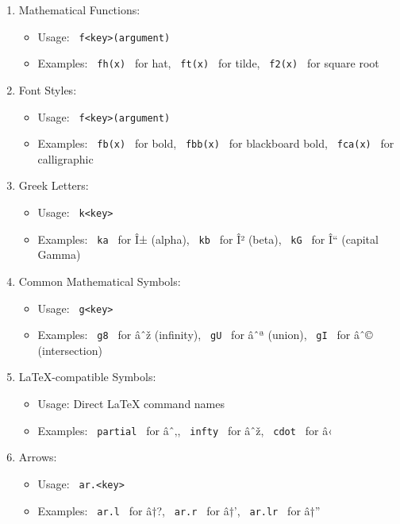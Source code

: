 \begin{enumerate}
\tightlist
\item
  Mathematical Functions:

  \begin{itemize}
  \tightlist
  \item
    Usage: \texttt{\ f\textless{}key\textgreater{}(argument)\ }
  \item
    Examples: \texttt{\ fh(x)\ } for hat, \texttt{\ ft(x)\ } for tilde,
    \texttt{\ f2(x)\ } for square root
  \end{itemize}
\item
  Font Styles:

  \begin{itemize}
  \tightlist
  \item
    Usage: \texttt{\ f\textless{}key\textgreater{}(argument)\ }
  \item
    Examples: \texttt{\ fb(x)\ } for bold, \texttt{\ fbb(x)\ } for
    blackboard bold, \texttt{\ fca(x)\ } for calligraphic
  \end{itemize}
\item
  Greek Letters:

  \begin{itemize}
  \tightlist
  \item
    Usage: \texttt{\ k\textless{}key\textgreater{}\ }
  \item
    Examples: \texttt{\ ka\ } for Î± (alpha), \texttt{\ kb\ } for Î²
    (beta), \texttt{\ kG\ } for Î`` (capital Gamma)
  \end{itemize}
\item
  Common Mathematical Symbols:

  \begin{itemize}
  \tightlist
  \item
    Usage: \texttt{\ g\textless{}key\textgreater{}\ }
  \item
    Examples: \texttt{\ g8\ } for âˆž (infinity), \texttt{\ gU\ } for
    âˆª (union), \texttt{\ gI\ } for âˆ© (intersection)
  \end{itemize}
\item
  LaTeX-compatible Symbols:

  \begin{itemize}
  \tightlist
  \item
    Usage: Direct LaTeX command names
  \item
    Examples: \texttt{\ partial\ } for âˆ‚, \texttt{\ infty\ } for âˆž,
    \texttt{\ cdot\ } for â‹
  \end{itemize}
\item
  Arrows:

  \begin{itemize}
  \tightlist
  \item
    Usage: \texttt{\ ar.\textless{}key\textgreater{}\ }
  \item
    Examples: \texttt{\ ar.l\ } for â†?, \texttt{\ ar.r\ } for â†',
    \texttt{\ ar.lr\ } for â†''
  \end{itemize}
\end{enumerate}

